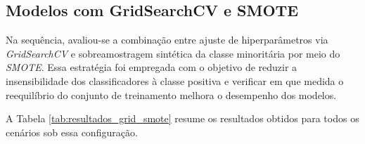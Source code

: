 \subsection{Modelos com GridSearchCV e SMOTE}

Na sequência, avaliou-se a combinação entre ajuste de hiperparâmetros via \textit{GridSearchCV} e sobreamostragem sintética da classe minoritária por meio do \textit{SMOTE}. Essa estratégia foi empregada com o objetivo de reduzir a insensibilidade dos classificadores à classe positiva e verificar em que medida o reequilíbrio do conjunto de treinamento melhora o desempenho dos modelos.

A Tabela \ref{tab:resultados_grid_smote} resume os resultados obtidos para todos os cenários sob essa configuração.

\begingroup
\footnotesize
\setlength{\tabcolsep}{4pt}

